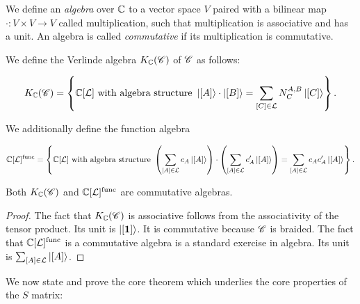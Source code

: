 We define an \textit{algebra} over $\mathbb{C}$ to a vector space $V$ paired with a bilinear map $\cdot: V\times V\to V$ called multiplication, such that multiplication is associative and has a unit. An algebra is called \textit{commutative} if its multiplication is commutative.

We define the Verlinde algebra $K_{\mathbb{C}}(\mathscr{C})$ of $\mathscr{C}$ as follows:

$$K_{\mathbb{C}}(\mathscr{C})=
\left\{
\mathbb{C}[\mathcal{L}] \text{ with algebra structure }
\ket{[A]}\cdot \ket{[B]}=\sum_{[C]\in \mathcal{L}}N^{A,B}_{C}\ket{[C]}
\right\}.$$

We additionally define the function algebra

$$
\mathbb{C}[\mathcal{L}]^{\text{func}}=
\left\{
\mathbb{C}[\mathcal{L}] \text{ with algebra structure }
\left(\sum_{[A]\in \mathcal{L}}c_A \ket{[A]}\right)\cdot \left(\sum_{[A]\in \mathcal{L}}c_A' \ket{[A]}\right)= \sum_{[A]\in \mathcal{L}}c_A c_A' \ket{[A]}
\right\}.
$$

\begin{lemma} Both $K_{\mathbb{C}}(\mathscr{C})$ and $\mathbb{C}[\mathcal{L}]^{\text{func}}$ are commutative algebras.
\end{lemma}
\begin{proof} The fact that $K_{\mathbb{C}}(\mathscr{C})$ is associative follows from the associativity of the tensor product. Its unit is $\ket{[\mathbf{1}]}$. It is commutative because $\mathscr{C}$ is braided. The fact that $\mathbb{C}[\mathcal{L}]^{\text{func}}$ is a commutative algebra is a standard exercise in algebra. Its unit is $\sum_{[A]\in \mathcal{L}}\ket{[A]}$.
\end{proof}


We now state and prove the core theorem which underlies the core properties of the $S$ matrix:

